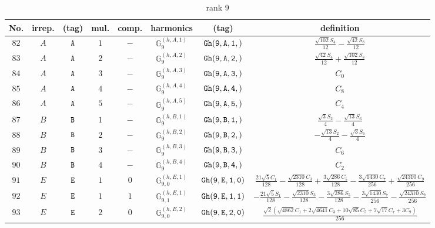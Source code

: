 \documentclass[fleqn,8pt]{jsarticle}
\begin{document}
\begin{table}[ht!]
\begin{center}
\caption{rank 9}
\renewcommand{\arraystretch}{1.3}
\begin{tabular}{cccccccc} \hline \hline
No. & irrep. & (tag) & mul. & comp. & harmonics & (tag) & definition \\ \hline
$ 82 $ & $ A $ & $ {\tt A} $ & $ 1 $ & $ - $ & $ \mathbb{G}_{9}^{(h,A,1)} $ & $ {\tt Gh(9,A,1,)} $ & $ \frac{\sqrt{102} S_{4}}{12} - \frac{\sqrt{42} S_{8}}{12} $ \\
$ 83 $ & $ A $ & $ {\tt A} $ & $ 2 $ & $ - $ & $ \mathbb{G}_{9}^{(h,A,2)} $ & $ {\tt Gh(9,A,2,)} $ & $ \frac{\sqrt{42} S_{4}}{12} + \frac{\sqrt{102} S_{8}}{12} $ \\
$ 84 $ & $ A $ & $ {\tt A} $ & $ 3 $ & $ - $ & $ \mathbb{G}_{9}^{(h,A,3)} $ & $ {\tt Gh(9,A,3,)} $ & $ C_{0} $ \\
$ 85 $ & $ A $ & $ {\tt A} $ & $ 4 $ & $ - $ & $ \mathbb{G}_{9}^{(h,A,4)} $ & $ {\tt Gh(9,A,4,)} $ & $ C_{8} $ \\
$ 86 $ & $ A $ & $ {\tt A} $ & $ 5 $ & $ - $ & $ \mathbb{G}_{9}^{(h,A,5)} $ & $ {\tt Gh(9,A,5,)} $ & $ C_{4} $ \\
$ 87 $ & $ B $ & $ {\tt B} $ & $ 1 $ & $ - $ & $ \mathbb{G}_{9}^{(h,B,1)} $ & $ {\tt Gh(9,B,1,)} $ & $ \frac{\sqrt{3} S_{2}}{4} - \frac{\sqrt{13} S_{6}}{4} $ \\
$ 88 $ & $ B $ & $ {\tt B} $ & $ 2 $ & $ - $ & $ \mathbb{G}_{9}^{(h,B,2)} $ & $ {\tt Gh(9,B,2,)} $ & $ - \frac{\sqrt{13} S_{2}}{4} - \frac{\sqrt{3} S_{6}}{4} $ \\
$ 89 $ & $ B $ & $ {\tt B} $ & $ 3 $ & $ - $ & $ \mathbb{G}_{9}^{(h,B,3)} $ & $ {\tt Gh(9,B,3,)} $ & $ C_{6} $ \\
$ 90 $ & $ B $ & $ {\tt B} $ & $ 4 $ & $ - $ & $ \mathbb{G}_{9}^{(h,B,4)} $ & $ {\tt Gh(9,B,4,)} $ & $ C_{2} $ \\
$ 91 $ & $ E $ & $ {\tt E} $ & $ 1 $ & $ 0 $ & $ \mathbb{G}_{9,0}^{(h,E,1)} $ & $ {\tt Gh(9,E,1,0)} $ & $ \frac{21 \sqrt{5} C_{1}}{128} - \frac{\sqrt{2310} C_{3}}{128} + \frac{3 \sqrt{286} C_{5}}{128} - \frac{3 \sqrt{1430} C_{7}}{256} + \frac{\sqrt{24310} C_{9}}{256} $ \\
$ 92 $ & $ E $ & $ {\tt E} $ & $ 1 $ & $ 1 $ & $ \mathbb{G}_{9,1}^{(h,E,1)} $ & $ {\tt Gh(9,E,1,1)} $ & $ - \frac{21 \sqrt{5} S_{1}}{128} - \frac{\sqrt{2310} S_{3}}{128} - \frac{3 \sqrt{286} S_{5}}{128} - \frac{3 \sqrt{1430} S_{7}}{256} - \frac{\sqrt{24310} S_{9}}{256} $ \\
$ 93 $ & $ E $ & $ {\tt E} $ & $ 2 $ & $ 0 $ & $ \mathbb{G}_{9,0}^{(h,E,2)} $ & $ {\tt Gh(9,E,2,0)} $ & $ \frac{\sqrt{2} \left(\sqrt{4862} C_{1} + 2 \sqrt{4641} C_{3} + 10 \sqrt{85} C_{5} + 7 \sqrt{17} C_{7} + 3 C_{9}\right)}{256} $ \\

\end{tabular}
\end{center}
\end{table}
\end{document}
